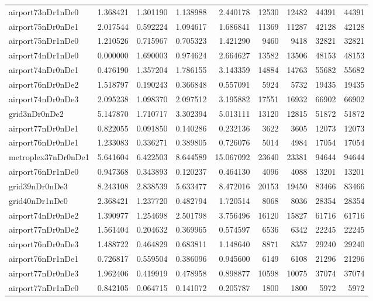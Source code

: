 \begin{longtable}{|l|r|r|r|r|r|r|r|r|}
airport73nDr1nDe0 & 1.368421 & 1.301190 & 1.138988 & 2.440178 & 12530 & 12482 & 44391 & 44391 \\
airport75nDr0nDe1 & 2.017544 & 0.592224 & 1.094617 & 1.686841 & 11369 & 11287 & 42128 & 42128 \\
airport75nDr1nDe0 & 1.210526 & 0.715967 & 0.705323 & 1.421290 & 9460 & 9418 & 32821 & 32821 \\
airport74nDr1nDe0 & 0.000000 & 1.690003 & 0.974624 & 2.664627 & 13582 & 13506 & 48153 & 48153 \\
airport74nDr0nDe1 & 0.476190 & 1.357204 & 1.786155 & 3.143359 & 14884 & 14763 & 55682 & 55682 \\
airport76nDr0nDe2 & 1.518797 & 0.190243 & 0.366848 & 0.557091 & 5924 & 5732 & 19435 & 19435 \\
airport74nDr0nDe3 & 2.095238 & 1.098370 & 2.097512 & 3.195882 & 17551 & 16932 & 66902 & 66902 \\
grid3nDr0nDe2 & 5.147870 & 1.710717 & 3.302394 & 5.013111 & 13120 & 12815 & 51872 & 51872 \\
airport77nDr0nDe1 & 0.822055 & 0.091850 & 0.140286 & 0.232136 & 3622 & 3605 & 12073 & 12073 \\
airport76nDr0nDe1 & 1.233083 & 0.336271 & 0.389805 & 0.726076 & 5014 & 4984 & 17054 & 17054 \\
metroplex37nDr0nDe1 & 5.641604 & 6.422503 & 8.644589 & 15.067092 & 23640 & 23381 & 94644 & 94644 \\
airport76nDr1nDe0 & 0.947368 & 0.343893 & 0.120237 & 0.464130 & 4096 & 4088 & 13201 & 13201 \\
grid39nDr0nDe3 & 8.243108 & 2.838539 & 5.633477 & 8.472016 & 20153 & 19450 & 83466 & 83466 \\
grid40nDr1nDe0 & 2.368421 & 1.237720 & 0.482794 & 1.720514 & 8068 & 8036 & 28354 & 28354 \\
airport74nDr0nDe2 & 1.390977 & 1.254698 & 2.501798 & 3.756496 & 16120 & 15827 & 61716 & 61716 \\
airport77nDr0nDe2 & 1.561404 & 0.204632 & 0.369965 & 0.574597 & 6536 & 6342 & 22245 & 22245 \\
airport76nDr0nDe3 & 1.488722 & 0.464829 & 0.683811 & 1.148640 & 8871 & 8357 & 29240 & 29240 \\
airport76nDr1nDe1 & 0.726817 & 0.559504 & 0.386096 & 0.945600 & 6149 & 6108 & 21296 & 21296 \\
airport77nDr0nDe3 & 1.962406 & 0.419919 & 0.478958 & 0.898877 & 10598 & 10075 & 37074 & 37074 \\
airport77nDr1nDe0 & 0.842105 & 0.064715 & 0.141072 & 0.205787 & 1800 & 1800 & 5972 & 5972 \\

\end{longtable}
